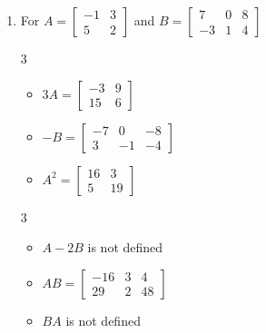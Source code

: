 \documentclass{ximera}
\begin{document}
\begin{enumerate}
\begin{multicols}{3}
\begin{itemize}
\item $BA = \left[ \begin{array}{rr} -32 & 70 \\ 4 & -29 \end{array} \right]$

\end{itemize}
\end{multicols}

\item For  $A = \left[ \begin{array}{rr} -1 & 3 \\ 5 & 2 \end{array} \right]$ and
 $B=\left[ \begin{array}{rrr} 7 & 0 & 8 \\ -3 & 1 & 4 \end{array} \right]$
 
\begin{multicols}{3}
\begin{itemize}
\item  $3A = \left[ \begin{array}{rr} -3 & 9 \\ 15 & 6\end{array} \right]$

\item $-B = \left[ \begin{array}{rrr} -7 & 0 & -8 \\ 3 & -1 & -4 \end{array} \right]$

\item $A^2 = \left[ \begin{array}{rr} 16 & 3 \\ 5 & 19 \end{array} \right]$

\end{itemize}
\end{multicols}


\begin{multicols}{3}
\begin{itemize}
\item  $A-2B$ is not defined

\item $AB = \left[ \begin{array}{rrr} -16 & 3 & 4 \\ 29 & 2 & 48 \end{array} \right]$

\item $BA$ is not defined


\end{itemize}
\end{multicols}
\end{enumerate}
\end{document}
